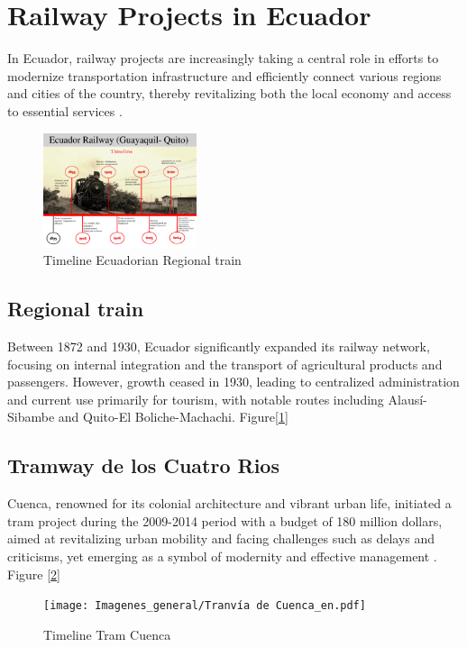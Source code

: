 \documentclass[conference]{IEEEtran}
\begin{document}
\section{Railway Projects in Ecuador}

In Ecuador, railway projects are increasingly taking a central role in efforts to modernize transportation infrastructure and efficiently connect various regions and cities of the country, thereby revitalizing both the local economy and access to essential services \cite{b2}. 
\begin{figure}[ht]
    \centering
    \includegraphics[width=0.4\textwidth]{Imagenes_general/Timeline railway Guayaquil - Quito_1.pdf}
    \caption{Timeline Ecuadorian Regional train}
    \label{fig:timeline_train_reg}
\end{figure}

\subsection{Regional train}

Between 1872 and 1930, Ecuador significantly expanded its railway network, focusing on internal integration and the transport of agricultural products and passengers. However, growth ceased in 1930, leading to centralized administration and current use primarily for tourism, with notable routes including Alausí-Sibambe and Quito-El Boliche-Machachi. Figure[\ref{fig:timeline_train_reg}]


\subsection{Tramway de los Cuatro Rios}

Cuenca, renowned for its colonial architecture and vibrant urban life, initiated a tram project during the 2009-2014 period with a budget of 180 million dollars, aimed at revitalizing urban mobility and facing challenges such as delays and criticisms, yet emerging as a symbol of modernity and effective management \cite{b3}. Figure [\ref{fig:timeline_train_cu}]

\begin{figure}[ht]
    \centering
    \texttt{[image: Imagenes\_general/Tranvía de Cuenca\_en.pdf]}
    \caption{Timeline Tram Cuenca}
    \label{fig:timeline_train_cu}
\end{figure}
\end{document}
